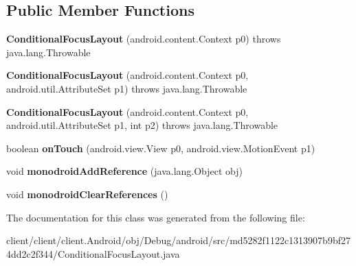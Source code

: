 \subsection*{Public Member Functions}
\begin{DoxyCompactItemize}
\item 
\hypertarget{classmd5282f1122c1313907b9bf274dd2c2f344_1_1ConditionalFocusLayout_a8fcfe3d4365bf523aab8d63b347fe841}{}{\bfseries Conditional\+Focus\+Layout} (android.\+content.\+Context p0)  throws java.\+lang.\+Throwable 	\label{classmd5282f1122c1313907b9bf274dd2c2f344_1_1ConditionalFocusLayout_a8fcfe3d4365bf523aab8d63b347fe841}

\item 
\hypertarget{classmd5282f1122c1313907b9bf274dd2c2f344_1_1ConditionalFocusLayout_abe0cf14fe75a89b164b35d861bda2718}{}{\bfseries Conditional\+Focus\+Layout} (android.\+content.\+Context p0, android.\+util.\+Attribute\+Set p1)  throws java.\+lang.\+Throwable 	\label{classmd5282f1122c1313907b9bf274dd2c2f344_1_1ConditionalFocusLayout_abe0cf14fe75a89b164b35d861bda2718}

\item 
\hypertarget{classmd5282f1122c1313907b9bf274dd2c2f344_1_1ConditionalFocusLayout_a447506c6bfdeb5a0009d73faee5c18ec}{}{\bfseries Conditional\+Focus\+Layout} (android.\+content.\+Context p0, android.\+util.\+Attribute\+Set p1, int p2)  throws java.\+lang.\+Throwable 	\label{classmd5282f1122c1313907b9bf274dd2c2f344_1_1ConditionalFocusLayout_a447506c6bfdeb5a0009d73faee5c18ec}

\item 
\hypertarget{classmd5282f1122c1313907b9bf274dd2c2f344_1_1ConditionalFocusLayout_af57f7d211335fd9e2781f26b30016cb0}{}boolean {\bfseries on\+Touch} (android.\+view.\+View p0, android.\+view.\+Motion\+Event p1)\label{classmd5282f1122c1313907b9bf274dd2c2f344_1_1ConditionalFocusLayout_af57f7d211335fd9e2781f26b30016cb0}

\item 
\hypertarget{classmd5282f1122c1313907b9bf274dd2c2f344_1_1ConditionalFocusLayout_a9073d49cb6e8a920a242066773a86a9b}{}void {\bfseries monodroid\+Add\+Reference} (java.\+lang.\+Object obj)\label{classmd5282f1122c1313907b9bf274dd2c2f344_1_1ConditionalFocusLayout_a9073d49cb6e8a920a242066773a86a9b}

\item 
\hypertarget{classmd5282f1122c1313907b9bf274dd2c2f344_1_1ConditionalFocusLayout_a6e4383aa7379ac42ad0a2e82f1ba1b4b}{}void {\bfseries monodroid\+Clear\+References} ()\label{classmd5282f1122c1313907b9bf274dd2c2f344_1_1ConditionalFocusLayout_a6e4383aa7379ac42ad0a2e82f1ba1b4b}

\end{DoxyCompactItemize}


The documentation for this class was generated from the following file\+:\begin{DoxyCompactItemize}
\item 
client/client/client.\+Android/obj/\+Debug/android/src/md5282f1122c1313907b9bf274dd2c2f344/Conditional\+Focus\+Layout.\+java\end{DoxyCompactItemize}
